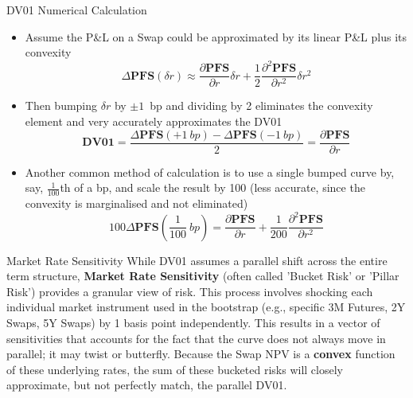 \documentclass{beamer}
\begin{document}
\begin{frame}{DV01 Numerical Calculation }
	\begin{itemize}
		\item<1-> Assume the P\&L on a Swap could be approximated by its linear P\&L plus its convexity
		\begin{equation*}
			\Delta \textbf{PFS}(\delta r)\approx \frac{\partial \textbf{PFS} }{\partial r}\delta r + \frac{1}{2}\frac{\partial^2 \textbf{PFS}}{\partial r^2}\delta r^2
		\end{equation*}
		\item<2-> Then bumping $\delta r$ by $\pm 1$~bp and dividing by 2 eliminates the convexity element and very accurately approximates the DV01
		\begin{equation*}
			\textbf{DV01} = \frac{\Delta \textbf{PFS}(+1~bp)-\Delta \textbf{PFS}(-1~bp)}{2}=\frac{\partial \textbf{PFS} }{\partial r}
		\end{equation*}
		\item<3-> Another common method of calculation is to use a single bumped curve by, say, $\frac{1}{100}$th of a bp, and scale the result by 100 (less accurate, since the convexity is marginalised and not eliminated)
		\begin{equation*}
			100\Delta \textbf{PFS}\left(\frac{1}{100}~bp\right)=\frac{\partial \textbf{PFS}}{\partial r}+\frac{1}{200}\frac{\partial^2\textbf{PFS}}{\partial r^2}
		\end{equation*}
	\end{itemize}
\end{frame}

\begin{frame}{Market Rate Sensitivity}
	While DV01 assumes a parallel shift across the entire term structure, \textbf{Market Rate Sensitivity} (often called 'Bucket Risk' or 'Pillar Risk') provides a granular view of risk.
	This process involves shocking each individual market instrument used in the bootstrap (e.g., specific 3M Futures, 2Y Swaps, 5Y Swaps) by 1 basis point independently.
	This results in a vector of sensitivities that accounts for the fact that the curve does not always move in parallel; it may twist or butterfly.
	Because the Swap NPV is a \textbf{convex} function of these underlying rates, the sum of these bucketed risks will closely approximate, but not perfectly match, the parallel DV01.
\end{frame}
\end{document}
